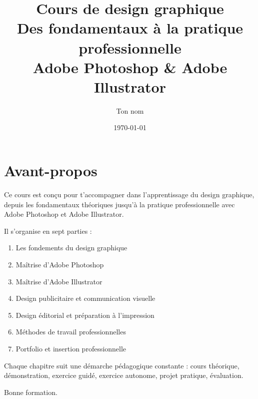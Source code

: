 \documentclass[11pt,a4paper,oneside]{book}
\title{
    \vspace{2cm}
    {\Huge\bfseries Cours de design graphique}\\[1em]
    {\Large Des fondamentaux à la pratique professionnelle}\\[2em]
    {\large Adobe Photoshop \& Adobe Illustrator}
    \vspace{2cm}
}
\author{Ton nom}
\date{\today}
\begin{document}
\frontmatter
\maketitle
\thispagestyle{empty}

\chapter*{Avant-propos}

Ce cours est conçu pour t'accompagner dans l'apprentissage du design graphique, depuis les fondamentaux théoriques jusqu'à la pratique professionnelle avec Adobe Photoshop et Adobe Illustrator.

Il s'organise en sept parties :

\begin{enumerate}
    \item Les fondements du design graphique
    \item Maîtrise d'Adobe Photoshop
    \item Maîtrise d'Adobe Illustrator
    \item Design publicitaire et communication visuelle
    \item Design éditorial et préparation à l'impression
    \item Méthodes de travail professionnelles
    \item Portfolio et insertion professionnelle
\end{enumerate}

Chaque chapitre suit une démarche pédagogique constante : cours théorique, démonstration, exercice guidé, exercice autonome, projet pratique, évaluation.

\vspace{1em}

Bonne formation.

\tableofcontents

\mainmatter
\end{document}
